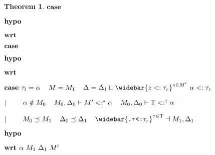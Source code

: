 \documentclass[acmsmall]{acmart}
\theoremstyle{definition}
\newtheorem{theorem}{Theorem}[section]
\begin{document}
\begin{theorem}
    \item \Z $\textbf{case } $
    \item \Z $\textbf{hypo } $
    \item \Z $\textbf{wrt } $
      \item \Z\Z {} 

    \item \Z $\textbf{case } $
    \item \Z $\textbf{hypo } $
    \item \Z $\textbf{wrt } $
      \item \Z\Z {} 


    \item \Z $\B{case } 
      \tau_l = \alpha
      \I
      M = M_1
      \I
      \Delta = \Delta_1 \sqcup \widebar{z <: \tau_r}^{z \in M'} \ \alpha <: \tau_r
    $
    \item \Z $|\ \ \ \ \ \ \ 
      \alpha \notin M_0
      \hspace{4mm}
      M_0, \Delta_0 \vdash M' <:^\star \alpha
      \hspace{4mm}
      M_0, \Delta_0 \vdash \mathrm{T} <:^\dagger \alpha
    $
    \item \Z $\contin
      M_0 \preceq M_1
      \I
      \Delta_0 \preceq \Delta_1
      \I
      \widebar{\code{.} \tau \code{<:} \tau_r}^{\tau \in \Tau}
      \given M_1, \Delta_1
    $
    \item \Z $\textbf{hypo } $
    \item \Z $\B{wrt } \alpha\ M_1\ \Delta_1\ M'$
      \item \Z\Z {} 


\end{theorem}
\end{document}
